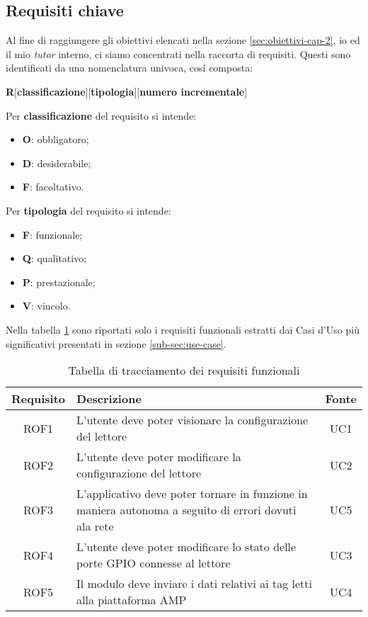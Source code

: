 \subsection{Requisiti chiave}
\label{sub-sec:req}
Al fine di raggiungere gli obiettivi elencati nella sezione \ref{sec:obiettivi-cap-2}, io ed il mio \emph{tutor} interno, ci siamo concentrati nella raccorta di requisiti. Questi sono identificati
da una nomenclatura univoca, cosí composta:
\begin{center}
    \textbf{R}[\textbf{classificazione}][\textbf{tipologia}][\textbf{numero incrementale}]
\end{center}
Per \textbf{classificazione} del requisito si intende:
\begin{itemize}
    \item \textbf{O}: obbligatoro;
    \item \textbf{D}: desiderabile;
    \item \textbf{F}: facoltativo.
\end{itemize}
Per \textbf{tipologia} del requisito si intende:
\begin{itemize}
    \item \textbf{F}: funzionale;
    \item \textbf{Q}: qualitativo;
    \item \textbf{P}: prestazionale;
    \item \textbf{V}: vincolo.
\end{itemize}
Nella tabella \ref{tab:requisiti-fun} sono riportati solo i requisiti funzionali estratti dai Casi d'Uso più significativi presentati in sezione \ref{sub-sec:use-case}.
\begin{table}[!htb]
    \begin{tabularx}{\textwidth}{ | c | X | c |}
    \hline
    \textbf{Requisito} & \textbf{Descrizione} & \textbf{Fonte}\\
    \hline
    ROF1 & L'utente deve poter visionare la configurazione del lettore & UC1 \\
    \hline
    ROF2 & L'utente deve poter modificare la configurazione del lettore & UC2 \\
    \hline
    ROF3 & L'applicativo deve poter tornare in funzione in maniera autonoma a seguito di errori dovuti ala rete & UC5 \\
    \hline
    ROF4 & L'utente deve poter modificare lo stato delle porte GPIO connesse al lettore & UC3 \\
    \hline
    ROF5 & Il modulo deve inviare i dati relativi ai tag letti alla piattaforma AMP & UC4 \\
    \hline
    \end{tabularx}
    \caption{Tabella di tracciamento dei requisiti funzionali}
    \label{tab:requisiti-fun}
\end{table}
